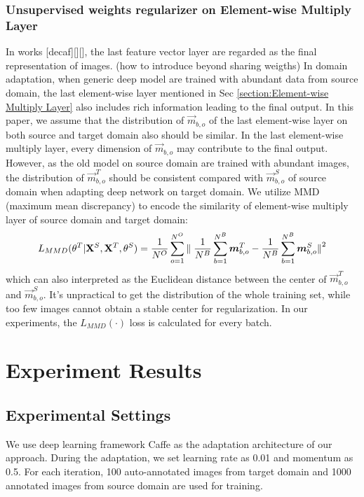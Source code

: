 \documentclass[runningheads]{llncs}
\begin{document}
\subsubsection{Unsupervised weights regularizer on Element-wise Multiply Layer}
In works [decaf][][], the last feature vector layer are regarded as the final representation of images. (how to introduce beyond sharing weigths) In domain adaptation, when generic deep model are trained with abundant data from source domain, the last element-wise layer mentioned in Sec \ref{section:Element-wise Multiply Layer} also includes rich information leading to the final output. In this paper, we assume that the distribution of $\vec{m}_{b,o}$ of the last element-wise layer on both source and target domain also should be similar. In the last element-wise multiply layer, every dimension of $\vec{m}_{b,o}$ may contribute to the final output. However, as the old model on source domain are trained with abundant images, the distribution of $\vec{m}^{T}_{b,o}$ should be consistent compared with $\vec{m}^{S}_{b,o}$ of source domain when adapting deep network on target domain. We utilize MMD (maximum mean discrepancy) to encode the similarity of element-wise multiply layer of source domain and target domain:
\begin{equation}\label{equation:LMMD}
  L_{MMD}(\theta^{T}|{\bf X}^{S},{\bf X}^{T},\theta^{S}) = \frac{1}{N^{O}} \sum^{N^{O}}_{o=1}{\parallel \frac{1}{N^{B}}\sum^{N^{B}}_{b=1}{\vec{m}^{T}_{b,o}} - \frac{1}{N^{B}}\sum^{N^{B}}_{b=1}{\vec{m}^{S}_{b,o}} {\parallel}^{2}  }
\end{equation}
which can also interpreted as the Euclidean distance between the center of $\vec{m}^{T}_{b,o}$ and $\vec{m}^{S}_{b,o}$. It's unpractical to get the distribution of the whole training set, while too few images cannot obtain a stable center for regularization. In our experiments, the $L_{MMD}(\cdot)$ loss is calculated for every batch.



\section{Experiment Results}

\subsection{Experimental Settings}
We use deep learning framework Caffe \cite{jia2014caffe} as the adaptation architecture of our approach. During the adaptation, we set learning rate as 0.01 and momentum as 0.5. For each iteration, 100 auto-annotated images from target domain and 1000 annotated images from source domain are used for training.
\end{document}
